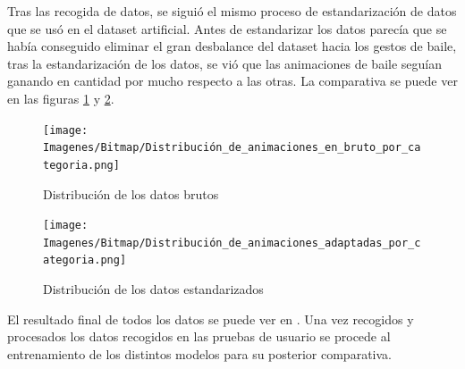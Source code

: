 Tras las recogida de datos, se siguió el mismo proceso de estandarización de datos que se usó en el dataset artificial. Antes de estandarizar los datos parecía que se había conseguido eliminar el gran desbalance del dataset hacia los gestos de baile, tras la estandarización de los datos, se vió que las animaciones de baile seguían ganando en cantidad por mucho respecto a las otras. La comparativa se puede ver en las figuras \ref{fig:datos-bruto} y \ref{fig:datos-estandar}.

\begin{figure}[H]
	\centering
	\texttt{[image: Imagenes/Bitmap/Distribución\_de\_animaciones\_en\_bruto\_por\_categoria.png]}
	\caption{Distribución de los datos brutos}
	\label{fig:datos-bruto}
\end{figure}

\begin{figure}[H]
	\centering
	\texttt{[image: Imagenes/Bitmap/Distribución\_de\_animaciones\_adaptadas\_por\_categoria.png]}
	\caption{Distribución de los datos estandarizados}
	\label{fig:datos-estandar}
\end{figure}

El resultado final de todos los datos se puede ver en \cite{csv-pose-animations}. Una vez recogidos y procesados los datos recogidos en las pruebas de usuario se procede al entrenamiento de los distintos modelos para su posterior comparativa.